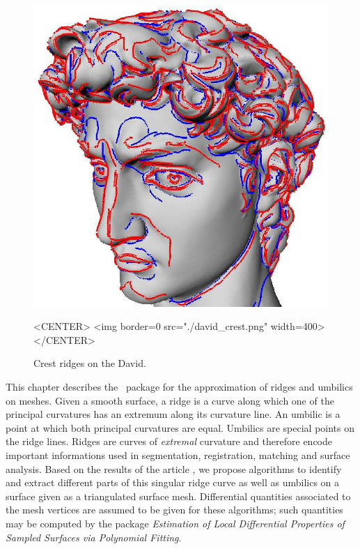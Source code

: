 

\newcommand{\FC}[1]{\protect{===FC SAYS: {#1}}}



\newtheorem{definition}{Definition.}
\newcommand{\hot}{h.o.t}%


\begin{figure}[!ht]
\begin{ccTexOnly}
\centerline{
\includegraphics[width=.5\linewidth]{Ridges_3/david_crest}}
\end{ccTexOnly}

\label{david-crest}
\begin{ccHtmlOnly}
<CENTER> <img border=0 src="./david_crest.png" width=400>
</CENTER>
\end{ccHtmlOnly}
\caption{Crest ridges on the David.}
\end{figure}

This chapter describes the \cgal\ package for the approximation of
ridges and umbilics on meshes.  Given a smooth surface, a ridge is a
curve along which one of the principal curvatures has an extremum
along its curvature line. An umbilic is a point at which both
principal curvatures are equal. Umbilics are special points on the
ridge lines. Ridges are curves of {\em extremal} curvature and
therefore encode important informations used in segmentation,
registration, matching and surface analysis.  Based on the results of
the article \cite{cgal:cp-tdare-05}, we propose algorithms to identify
and extract different parts of this singular ridge curve as well as
umbilics on a surface given as a triangulated surface mesh. Differential
quantities associated to the mesh vertices are assumed to be given for
these algorithms; such quantities may be computed by the package {\em
Estimation of Local Differential Properties of Sampled Surfaces via
Polynomial Fitting}.

